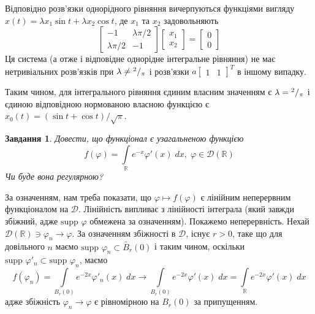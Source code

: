 \documentclass[10pt]{article}
\newtheorem{prob}{Завдання}
\newcommand{\dx}{\;dx}
\let\oldint\int
\renewcommand{\int}{\oldint\limits}
\let\phi\varphi
\begin{document}
	Відповідно розв’язки однорідного рівняння вичерпуються функціями вигляду
	$x(t)=\lambda x_1\sin t+\lambda x_2\cos t$, де $x_1$ та $x_2$ задовольняють
	\[\begin{bmatrix}
		-1&\lambda\pi/2\\
		\lambda\pi/2&-1
	\end{bmatrix}
	\begin{bmatrix}x_1\\x_2\end{bmatrix}=\begin{bmatrix}0\\0\end{bmatrix}\]
	Ця система (а отже і відповідне однорідне інтегральне рівняння) не має нетривіальних розв’язків при 
	$\lambda\neq{^{2}/_{\pi}}$ і розв’язки $a\begin{bmatrix}1&1\end{bmatrix}^T$ в іншому випадку.

	Таким чином, для інтегрального рівняння єдиним власним значенням є $\lambda={^{2}/_{\pi}}$ і єдиною відповідною нормованою
	власною функцією є $x_0(t)=(\sin t+\cos t)/\sqrt{\pi}$.
\begin{prob}
	Довести, що функціонал є узагальненою функцією	\[f(\phi)=\int_{\mathbb{R}}e^{-x}\phi'(x)\dx,\;\phi\in\mathcal{D}(\mathbb{R})\]
	Чи буде вона регулярною?
\end{prob}
\newcommand{\supp}{\mbox{supp }}
За означенням, нам треба показати, що $\phi\mapsto f(\phi)$ є лінійним неперервним функціоналом на $\mathcal{D}$. Лінійність
випливає з лінійності інтеграла (який завжди збіжний, адже $\supp \phi$ обмежена за означенням). Покажемо неперервність.
Нехай $\mathcal{D}(\mathbb{R})\ni\phi_n\to\phi$. За означенням
збіжності в $\mathcal{D}$, існує $r>0$, таке що для довільного
$n$ маємо $\supp\phi_n\subset\widetilde{B_r}(0)$ і таким чином, оскільки $\supp\phi'_n\subset\supp\phi_n$, маємо
\[f(\phi_n)=\int_{B_r(0)}e^{-2x}\phi'_n(x)\dx\to\int_{B_r(0)}e^{-2x}\phi'(x)\dx=\int_{\mathbb{R}}e^{-2x}\phi'(x)\dx\]
адже збіжність $\phi_n\to\phi$ є рівномірною на $B_r(0)$ за припущенням.
\end{document}
